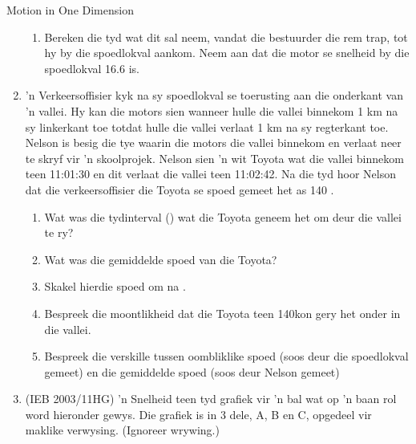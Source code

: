 \begin{eocexercises}{Motion in One Dimension}
\begin{enumerate}[noitemsep, label=\textbf{\arabic*}. ]
\begin{enumerate}
        \item Bereken die tyd wat dit sal neem, vandat die bestuurder die rem trap, tot hy by die spoedlokval aankom. Neem aan dat die motor se snelheid by die spoedlokval 16.6 \ms is.

    \end{enumerate}

    \item 'n Verkeersoffisier kyk na sy spoedlokval se toerusting aan die onderkant van 'n vallei. Hy kan die motors sien wanneer hulle die vallei binnekom 1 km na sy linkerkant toe totdat hulle die vallei verlaat 1 km na sy regterkant toe. Nelson is besig die tye waarin die motors die vallei binnekom en verlaat neer te skryf vir 'n skoolprojek. Nelson sien 'n wit Toyota wat die vallei binnekom teen 11:01:30 en dit verlaat die vallei teen 11:02:42. Na die tyd hoor Nelson dat die verkeersoffisier die Toyota se spoed gemeet het as 140 \kph.
    \begin{enumerate}
        \item Wat was die tydinterval (\dt) wat die Toyota geneem het om deur die vallei te ry?
        \item Wat was die gemiddelde spoed van die Toyota?
        \item Skakel hierdie spoed om na \kph.
        \item Bespreek die moontlikheid dat die Toyota teen 140\kph kon gery het onder in die vallei.
        \item Bespreek die verskille tussen oombliklike spoed (soos deur die spoedlokval gemeet) en die gemiddelde spoed (soos deur Nelson gemeet)
    \end{enumerate}

    \item (IEB 2003/11HG) 'n Snelheid teen tyd grafiek vir 'n bal wat op 'n baan rol word hier\-onder gewys. Die grafiek is in 3 dele, A, B en C, opgedeel vir maklike verwysing. (Ignoreer wrywing.)

    \begin{center}
    \end{center}


\end{enumerate}
\end{eocexercises}
